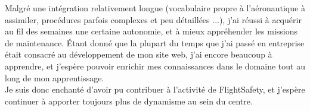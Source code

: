 \documentclass[a4paper,french,11pt,openany,oneside]{memoir}
\begin{document}
Malgré une intégration relativement longue (vocabulaire propre à l'aéronautique à assimiler, procédures parfois complexes et peu détaillées ...), j'ai réussi à acquérir au fil des semaines une certaine autonomie, et à mieux appréhender les missions de maintenance. Étant donné que la plupart du temps que j'ai passé en entreprise était consacré au développement de mon site web, j'ai encore beaucoup à apprendre, et j'espère pouvoir enrichir mes connaissances dans le domaine tout au long de mon apprentissage. \\

Je suis donc enchanté d'avoir pu contribuer à l'activité de FlightSafety, et j'espère continuer à apporter toujours plus de dynamisme au sein du centre.
\end{document}
